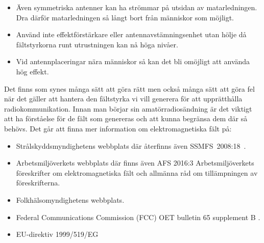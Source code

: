 \begin{itemize}
\item Även symmetriska antenner kan ha strömmar på utsidan av matarledningen.
  Dra därför matarledningen så långt bort från människor som möjligt.

\item Använd inte effektförstärkare eller antennavstämningsenhet utan
  hölje då fältstyrkorna runt utrustningen kan nå höga nivåer.

\item Vid antennplaceringar nära människor så kan det bli omöjligt att
  använda hög effekt.
\end{itemize}

Det finns som synes många sätt att göra rätt men också många sätt att göra fel
när det gäller att hantera den fältstyrka vi vill generera för att upprätthålla
radiokommunikation.
Innan man börjar sin amatörradiosändning är det viktigt att ha förståelse för
de fält som genereras och att kunna begränsa dem där så behövs.
Det går att finna mer information om elektromagnetiska fält på:

\begin{itemize}
\item Strålskyddsmyndighetens webbplats där återfinns även SSMFS~2008:18~\cite{SSMFS2008:18}.

\item Arbetsmiljöverkets webbplats där finns även AFS 2016:3 Arbetsmiljöverkets
föreskrifter om elektromagnetiska fält och allmänna råd om tillämpningen av
föreskrifterna.

\item Folkhälsomyndighetens webbplats.

\item Federal Communications Commission (FCC) OET bulletin 65 supplement B \cite{OETbul65b}.

\item EU-direktiv 1999/519/EG~\cite{1999/519/EG}
\end{itemize}
